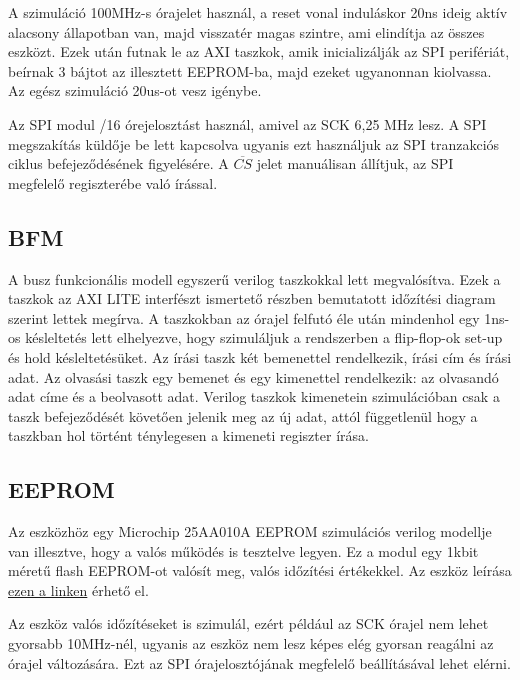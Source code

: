 \documentclass[a4paper,11pt]{article}
\begin{document}
A szimuláció 100MHz-s órajelet használ, a reset vonal induláskor 20ns ideig aktív alacsony állapotban van, majd visszatér magas szintre, ami elindítja az összes eszközt. Ezek után futnak le az AXI taszkok, amik inicializálják az SPI perifériát, beírnak 3 bájtot az illesztett EEPROM-ba, majd ezeket ugyanonnan kiolvassa. Az egész szimuláció 20us-ot vesz igénybe.

Az SPI modul /16 órejelosztást használ, amivel az SCK 6,25 MHz lesz. A SPI megszakítás küldője be lett kapcsolva ugyanis ezt használjuk az SPI tranzakciós ciklus befejeződésének figyelésére. A $\overline{CS}$ jelet manuálisan állítjuk, az SPI megfelelő regiszterébe való írással.
\subsection{BFM}

A busz funkcionális modell egyszerű verilog taszkokkal lett megvalósítva. Ezek a taszkok az AXI LITE interfészt ismertető részben bemutatott időzítési diagram szerint lettek megírva. A taszkokban az órajel felfutó éle után mindenhol egy 1ns-os késleltetés lett elhelyezve, hogy szimuláljuk a rendszerben a flip-flop-ok set-up és hold késleltetésüket. Az írási taszk két bemenettel rendelkezik, írási cím és írási adat. Az olvasási taszk egy bemenet és egy kimenettel rendelkezik: az olvasandó adat címe és a beolvasott adat. Verilog taszkok kimenetein szimulációban csak a taszk befejeződését követően jelenik meg az új adat, attól függetlenül hogy a taszkban hol történt ténylegesen a kimeneti regiszter írása.

\subsection{EEPROM}
Az eszközhöz egy Microchip 25AA010A EEPROM szimulációs verilog modellje van illesztve, hogy a valós működés is tesztelve legyen. Ez a modul egy 1kbit méretű flash EEPROM-ot valósít meg, valós időzítési értékekkel. Az eszköz leírása \href{http://ww1.microchip.com/downloads/en/DeviceDoc/21832H.pdf}{ezen a linken} érhető el.

Az eszköz valós időzítéseket is szimulál, ezért például az SCK órajel nem lehet gyorsabb 10MHz-nél, ugyanis az eszköz nem lesz képes elég gyorsan reagálni az órajel változására. Ezt az SPI órajelosztójának megfelelő beállításával lehet elérni.
\end{document}
